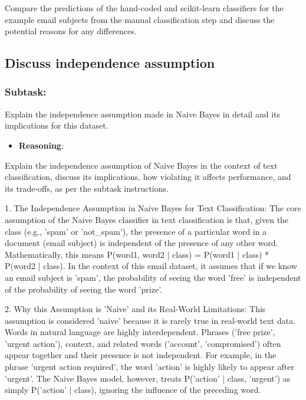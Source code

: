 \documentclass[12pt,a4paper]{article}
\begin{document}
Compare the predictions of the hand-coded and scikit-learn classifiers for the example email subjects from the manual classification step and discuss the potential reasons for any differences.



\subsection{Discuss independence assumption}

\subsubsection{Subtask:}
Explain the independence assumption made in Naive Bayes in detail and its implications for this dataset.


\begin{itemize}
    \item \textbf{Reasoning}:
\end{itemize}

Explain the independence assumption of Naive Bayes in the context of text classification, discuss its implications, how violating it affects performance, and its trade-offs, as per the subtask instructions.




1. The Independence Assumption in Naive Bayes for Text Classification:
   The core assumption of the Naive Bayes classifier in text classification is that,
   given the class (e.g., 'spam' or 'not\_spam'), the presence of a particular word
   in a document (email subject) is independent of the presence of any other word.
   Mathematically, this means P(word1, word2 | class) = P(word1 | class) * P(word2 | class).
   In the context of this email dataset, it assumes that if we know an email subject
   is 'spam', the probability of seeing the word 'free' is independent of the
   probability of seeing the word 'prize'.

2. Why this Assumption is 'Naive' and its Real-World Limitations:
   This assumption is considered 'naive' because it is rarely true in real-world
   text data. Words in natural language are highly interdependent.
   Phrases ('free prize', 'urgent action'), context, and related words ('account', 'compromised')
   often appear together and their presence is not independent.
   For example, in the phrase 'urgent action required', the word 'action' is highly likely
   to appear after 'urgent'. The Naive Bayes model, however, treats P('action' | class, 'urgent')
   as simply P('action' | class), ignoring the influence of the preceding word.
\end{document}
